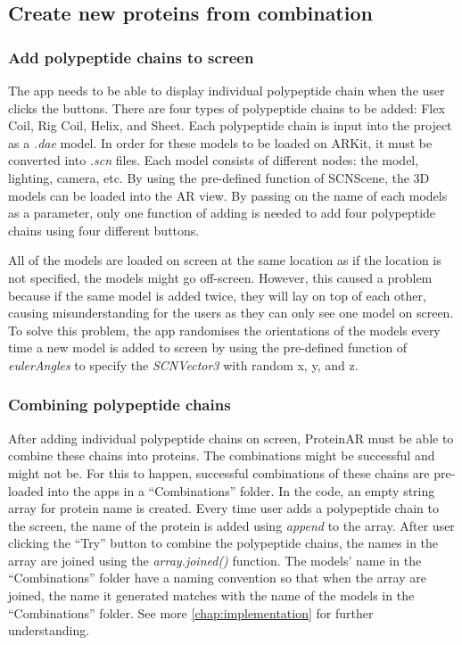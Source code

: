 \subsection{Create new proteins from combination}
\subsubsection{Add polypeptide chains to screen}
The app needs to be able to display individual polypeptide chain when the user clicks the buttons. There are four types of polypeptide chains to be added: Flex Coil, Rig Coil, Helix, and Sheet. Each polypeptide chain is input into the project as a \emph{.dae} model. In order for these models to be loaded on ARKit, it must be converted into \emph{.scn} files. Each model consists of different nodes: the model, lighting, camera, etc. By using the pre-defined function of SCNScene, the 3D models can be loaded into the AR view. By passing on the name of each models as a parameter, only one function of adding is needed to add four polypeptide chains using four different buttons. 

All of the models are loaded on screen at the same location as if the location is not specified, the models might go off-screen. However, this caused a problem because if the same model is added twice, they will lay on top of each other, causing misunderstanding for the users as they can only see one model on screen. To solve this problem, the app randomises the orientations of the models every time a new model is added to screen by using the pre-defined function of \emph{eulerAngles} to specify the \emph{SCNVector3} with random x, y, and z.

\subsubsection{Combining polypeptide chains}
After adding individual polypeptide chains on screen, ProteinAR must be able to combine these chains into proteins. The combinations might be successful and might not be. For this to happen, successful combinations of these chains are pre-loaded into the apps in a “Combinations” folder. 
In the code, an empty string array for protein name is created. Every time user adds a polypeptide chain to the screen, the name of the protein is added using \emph{append} to the array. After user clicking the “Try” button to combine the polypeptide chains, the names in the array are joined using the \emph{array.joined()} function. The models’ name in the “Combinations” folder have a naming convention so that when the array are joined, the name it generated matches with the name of the models in the “Combinations” folder. See more \autoref{chap:implementation} for further understanding. 
